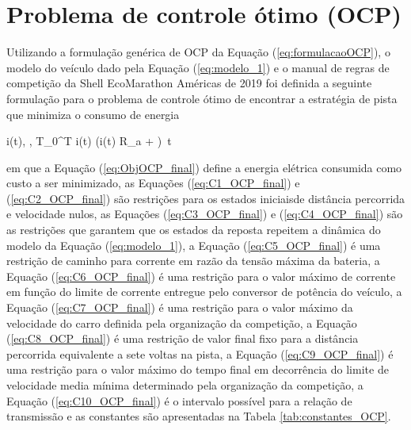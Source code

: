 \section{Problema de controle ótimo (OCP)}
\label{sec:OCPporposto}

Utilizando a formulação genérica de OCP da Equação (\ref{eq:formulacaoOCP}), o modelo do veículo dado pela Equação (\ref{eq:modelo_1})
e o manual de regras de competição da Shell EcoMarathon Américas de 2019 
foi definida a seguinte formulação para o problema de controle ótimo de encontrar a estratégia de pista que minimiza o consumo de energia

\begin{mini!}
	{i(t), \varphi, T}{\int_{0}^{T} i(t) \cdot \left(i(t) \cdot R_a +  \right) \,t \label{eq:ObjOCP_final}}
	{\label{eq:formulacaoOCP_final}}{}
\end{mini!}

em que a Equação (\ref{eq:ObjOCP_final}) define a energia elétrica consumida como custo a ser minimizado, 
as Equações (\ref{eq:C1_OCP_final}) e (\ref{eq:C2_OCP_final}) são restrições para os estados iniciaisde distância  percorrida e velocidade nulos, 
as Equações (\ref{eq:C3_OCP_final}) e (\ref{eq:C4_OCP_final}) são as restrições que garantem que os estados da reposta repeitem a dinâmica do modelo da Equação (\ref{eq:modelo_1}), 
a Equação (\ref{eq:C5_OCP_final}) é uma restrição de caminho para corrente em razão da tensão máxima da bateria, 
a Equação (\ref{eq:C6_OCP_final}) é uma restrição para o valor máximo de corrente em função do limite de corrente entregue pelo conversor de potência do veículo,
a Equação (\ref{eq:C7_OCP_final}) é uma restrição para o valor máximo da velocidade do carro definida pela organização da competição,
a Equação (\ref{eq:C8_OCP_final}) é uma restrição de valor final fixo para a distância  percorrida equivalente a sete voltas na pista,
a Equação (\ref{eq:C9_OCP_final}) é uma restrição para o valor máximo do tempo final em decorrência do limite de velocidade media mínima determinado pela organização da competição,
a Equação (\ref{eq:C10_OCP_final}) é o intervalo possível para a relação de transmissão
e as constantes são apresentadas na Tabela \ref*{tab:constantes_OCP}.


